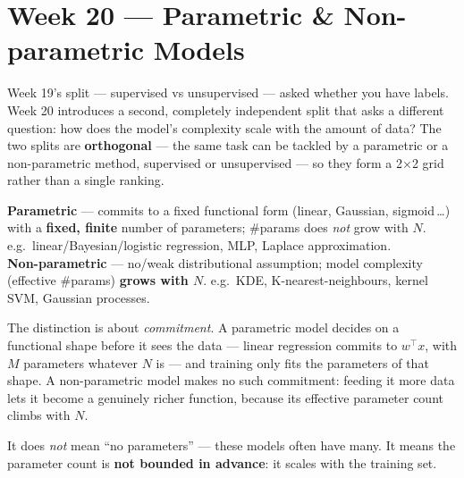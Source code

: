 \documentclass[11pt, a4paper]{article}
\newcommand{\kw}[1]{\textbf{#1}}
\begin{document}
\section{Week 20 — Parametric \& Non-parametric Models}

Week 19's split — supervised vs unsupervised — asked whether you have labels. Week 20 introduces a
second, completely independent split that asks a different question: how does the model's complexity
scale with the amount of data? The two splits are \kw{orthogonal} — the same task can be tackled by
a parametric or a non-parametric method, supervised or unsupervised — so they form a 2×2 grid rather
than a single ranking.

\begin{defbox}
\kw{Parametric} — commits to a fixed functional form (linear, Gaussian, sigmoid\,\dots) with a
\kw{fixed, finite} number of parameters; \#params does \emph{not} grow with $N$.
e.g.\ linear/Bayesian/logistic regression, MLP, Laplace approximation. \\
\kw{Non-parametric} — no/weak distributional assumption; model complexity (effective \#params)
\kw{grows with $N$}. e.g.\ KDE, K-nearest-neighbours, kernel SVM, Gaussian processes.
\end{defbox}

The distinction is about \emph{commitment}. A parametric model decides on a functional shape before
it sees the data — linear regression commits to $w^\top x$, with $M$ parameters whatever $N$ is —
and training only fits the parameters of that shape. A non-parametric model makes no such
commitment: feeding it more data lets it become a genuinely richer function, because its effective
parameter count climbs with $N$.

\begin{trapbox}
It does \emph{not} mean ``no parameters'' — these models often have many. It means the parameter
count is \kw{not bounded in advance}: it scales with the training set.
\end{trapbox}
\end{document}
